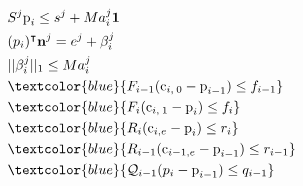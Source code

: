 \begin{align}
                                    \quad & \quad \quad S^j \mbox{p}_i \leq s^j + M a_i^j \textbf{1} \nonumber\\
                                    \quad & \quad \quad (p_i)^{\intercal} \textbf{n}^j = e^j + \beta_i^j \nonumber\\
                                    \quad & \quad \quad ||\beta_i^j||_1 \leq M a_i^j \nonumber\\
                                    \quad & \quad \quad \textcolor{blue}{F_{i-1} (\mbox{c}_{i,\:0}-\mbox{p}_{i-1}) \leq  f_{i-1}} \nonumber\\
                                    \quad & \quad \quad \textcolor{blue}{F_{i} (\mbox{c}_{i,\:1}-\mbox{p}_{i}) \leq  f_{i}}  \nonumber\\
                                    \quad & \quad \quad \textcolor{blue}{R_{i} (\mbox{c}_{i,e} - \mbox{p}_{i}) \leq r_i}  \nonumber\\
                                    \quad & \quad \quad \textcolor{blue}{R_{i-1} (\mbox{c}_{i-1,e} - \mbox{p}_{i-1}) \leq r_{i-1}} \nonumber\\
                                    \quad & \quad \quad \textcolor{blue}{\mathcal{Q}_{i-1} (p_i - \mbox{p}_{i-1}) \leq q_{i-1}} \nonumber
\end{align}